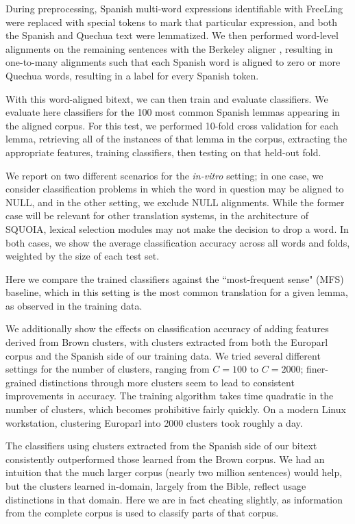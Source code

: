 \documentclass[10pt, a4paper]{article}
\begin{document}
During preprocessing, Spanish multi-word expressions identifiable with FreeLing
were replaced with special tokens to mark that particular expression, and both
the Spanish and Quechua text were lemmatized. We then performed word-level
alignments on the remaining sentences with the Berkeley aligner
\cite{denero-klein:2007:ACLMain}, resulting in one-to-many alignments such that
each Spanish word is aligned to zero or more Quechua words, resulting in a
label for every Spanish token.

With this word-aligned bitext, we can then train and evaluate classifiers.
We evaluate here classifiers for the 100 most common Spanish lemmas appearing
in the aligned corpus. For this test, we performed 10-fold cross validation for
each lemma, retrieving all of the instances of that lemma in the corpus,
extracting the appropriate features, training classifiers, then testing on
that held-out fold.

We report on two different scenarios for the \emph{in-vitro} setting; in one
case, we consider classification problems in which the word in question may be
aligned to NULL, and in the other setting, we exclude NULL alignments. While
the former case will be relevant for other translation systems, in the
architecture of SQUOIA, lexical selection modules may not make the decision to
drop a word. In both cases, we show the average classification accuracy across
all words and folds, weighted by the size of each test set.

Here we compare the trained classifiers against the ``most-frequent sense"
(MFS) baseline, which in this setting is the most common translation for a
given lemma, as observed in the training data.

We additionally show the effects on classification accuracy of adding features
derived from Brown clusters, with clusters extracted from both the Europarl
corpus and the Spanish side of our training data. We tried several different
settings for the number of clusters, ranging from $C=100$ to $C=2000$;
finer-grained distinctions through more clusters seem to lead to consistent
improvements in accuracy.  The training algorithm takes time quadratic in the
number of clusters, which becomes prohibitive fairly quickly. On a modern Linux
workstation, clustering Europarl into 2000 clusters took roughly a day.

The classifiers using clusters extracted from the Spanish side of our bitext
consistently outperformed those learned from the Brown corpus. We had an
intuition that the much larger corpus (nearly two million sentences) would
help, but the clusters learned in-domain, largely from the Bible, reflect
usage distinctions in that domain. Here we are in fact cheating slightly, as
information from the complete corpus is used to classify parts of that corpus.
\end{document}
